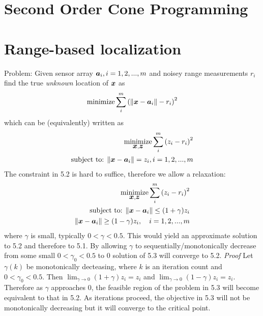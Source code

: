 \label{chapter:socp}

%
%
%
%

\section{Second Order Cone Programming}

\section{Range-based localization}

Problem:
Given sensor array ${\mbox{\boldmath$a$}_i, i = 1, 2, ..., m}$ and noisey range measurements $r_i$ find the true \textit{unknown} location of $\mbox{\boldmath$x$}$ as 
\begin{equation} %
\Min \sum^m_i \left( \|\Bx - \Ba_i\| - r_i \right)^2 
\end{equation}
which can be (equivalently) written as 
\begin{eqnarray} %
\Min_{\Bx, \Bz} \sum^m_i \left( z_i - r_i \right)^2 \\
\setcounter{equation}{2}
\mbox{subject to: } \|\Bx - \Ba_i\| = z_i, i = 1, 2, ..., m
\end{eqnarray}
The constraint in 5.2 is hard to suffice, therefore we allow a relaxation:
\begin{eqnarray} %
\Min_{\Bx, \Bz} \sum^m_i \left( z_i - r_i \right)^2 \\
\setcounter{equation}{3}
\mbox{subject to: } \|\Bx - \Ba_i\| \leq (1+ \gamma)z_i  \\
\setcounter{equation}{3}
\|\Bx - \Ba_i\| \geq (1 - \gamma)z_i, \quad i = 1, 2, ..., m
\end{eqnarray}
where $\gamma$ is small, typically $0 < \gamma < 0.5$.
This would yield an approximate solution to 5.2 and therefore to 5.1. 
By allowing $\gamma$ to sequentially/monotonically decrease from some small $0 < \gamma_0 < 0.5$ to 0 solution of 5.3 will converge to 5.2.
\textit{Proof} Let $\gamma(k)$ be monotonically decteasing, where $k$ is an iteration count and $0 < \gamma_0 < 0.5$. Then 
$\lim_{\gamma \rightarrow 0} (1 + \gamma)z_i = z_i$ and $\lim_{\gamma \rightarrow 0} (1 - \gamma)z_i = z_i$. Therefore as $\gamma$ approaches 0, the feasible region of the problem in 5.3 will become equivalent to that in 5.2.
As iterations proceed, the objective in 5.3 will not be monotonically decreasing but it will converge to the critical point.

